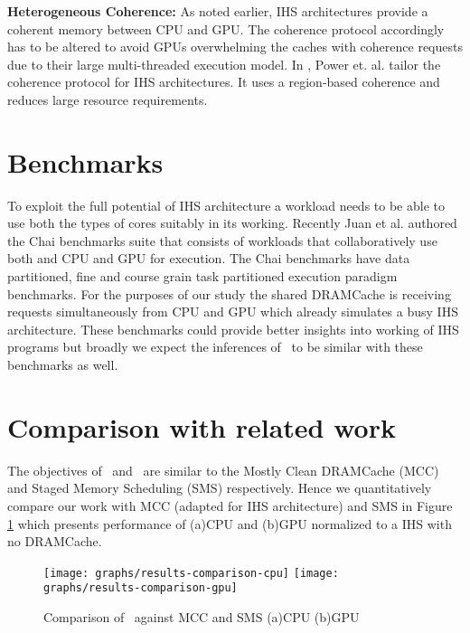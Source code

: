 \par \textbf{Heterogeneous Coherence:} As noted earlier, IHS architectures provide a coherent memory between CPU and GPU. The coherence protocol accordingly has to be altered to avoid GPUs overwhelming the caches with coherence requests due to their large multi-threaded execution model. In \cite{hsc-coherence}, Power et. al. tailor the coherence protocol for IHS architectures. It uses a region-based coherence and reduces large resource requirements.

\section{Benchmarks}
To exploit the full potential of IHS architecture a workload needs to be able to use both the types of cores suitably in its working. Recently Juan et al. authored the Chai benchmarks suite \cite{chai} that consists of workloads that collaboratively use both and CPU and GPU for execution. The Chai benchmarks have data partitioned, fine and course grain task partitioned execution paradigm benchmarks. For the purposes of our study the shared DRAMCache is receiving requests simultaneously from CPU and GPU which already simulates a busy IHS architecture. These benchmarks could provide better insights into working of IHS programs but broadly we expect the inferences of \cachename\ to be similar with these benchmarks as well.

\section{Comparison with related work} \label{comparison}
The objectives of \bypassname\ and \prioname\ are similar to the Mostly Clean DRAMCache (MCC) \cite{mostly-clean} and Staged Memory Scheduling (SMS) \cite{sms} respectively. Hence we quantitatively 	compare our work with MCC (adapted for IHS architecture) and SMS in Figure \ref{results-comparison} which presents performance of (a)CPU and (b)GPU normalized to a IHS with no DRAMCache. 

\begin{figure}[!htb]
	\centering
	\texttt{[image: graphs/results-comparison-cpu]}
	\texttt{[image: graphs/results-comparison-gpu]}
	\caption{Comparison of \cachename\ against MCC \cite{mostly-clean} and SMS \cite{sms} (a)CPU (b)GPU}
	\label{results-comparison}
\end{figure}

